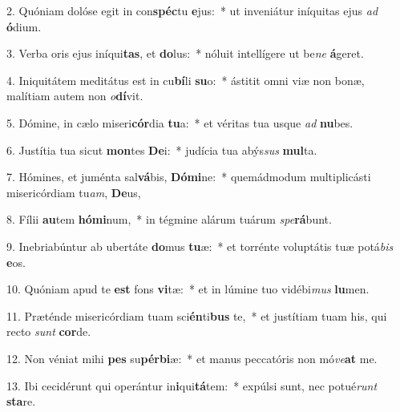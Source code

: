 2. Quóniam dolóse egit in con\textbf{spéc}tu \textbf{e}jus:~*  ut inveniátur iníquitas ejus \textit{ad} \textbf{ó}dium.\

3. Verba oris ejus iníqui\textbf{tas}, et \textbf{do}lus:~*  nóluit intellígere ut be\textit{ne} \textbf{á}geret.\

4. Iniquitátem meditátus est in cu\textbf{bí}li \textbf{su}o:~*  ástitit omni viæ non bonæ, malítiam autem non \textit{o}\textbf{dí}vit.\

5. Dómine, in cælo miseri\textbf{cór}dia \textbf{tu}a:~*  et véritas tua usque \textit{ad} \textbf{nu}bes.\

6. Justítia tua sicut \textbf{mon}tes \textbf{De}i:~*  judícia tua abýs\textit{sus} \textbf{mul}ta.\

7. Hómines, et juménta sal\textbf{vá}bis, \textbf{Dó}\textbf{mi}ne:~*  quemádmodum multiplicásti misericórdiam tu\textit{am}, \textbf{De}us,\

8. Fílii \textbf{au}tem \textbf{hó}\textbf{mi}num,~*  in tégmine alárum tuárum \textit{spe}\textbf{rá}bunt.\

9. Inebriabúntur ab ubertáte \textbf{do}mus \textbf{tu}æ:~*  et torrénte voluptátis tuæ potá\textit{bis} \textbf{e}os.\

10. Quóniam apud te \textbf{est} fons \textbf{vi}tæ:~*  et in lúmine tuo vidébi\textit{mus} \textbf{lu}men.\

11. Præténde misericórdiam tuam sci\textbf{én}ti\textbf{bus} te,~*  et justítiam tuam his, qui recto \textit{sunt} \textbf{cor}de.\

12. Non véniat mihi \textbf{pes} su\textbf{pér}\textbf{bi}æ:~*  et manus peccatóris non mó\textit{ve}\textbf{at} me.\

13. Ibi cecidérunt qui operántur in\textbf{i}qui\textbf{tá}tem:~*  expúlsi sunt, nec potué\textit{runt} \textbf{sta}re.\

